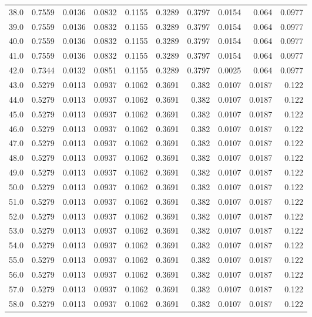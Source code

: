 \begin{longtable}{lrrrrrrrrr}
38.0 & 0.7559 & 0.0136 & 0.0832 & 0.1155 & 0.3289 & 0.3797 & 0.0154 & 0.064 & 0.0977 \\
39.0 & 0.7559 & 0.0136 & 0.0832 & 0.1155 & 0.3289 & 0.3797 & 0.0154 & 0.064 & 0.0977 \\
40.0 & 0.7559 & 0.0136 & 0.0832 & 0.1155 & 0.3289 & 0.3797 & 0.0154 & 0.064 & 0.0977 \\
41.0 & 0.7559 & 0.0136 & 0.0832 & 0.1155 & 0.3289 & 0.3797 & 0.0154 & 0.064 & 0.0977 \\
42.0 & 0.7344 & 0.0132 & 0.0851 & 0.1155 & 0.3289 & 0.3797 & 0.0025 & 0.064 & 0.0977 \\
43.0 & 0.5279 & 0.0113 & 0.0937 & 0.1062 & 0.3691 & 0.382 & 0.0107 & 0.0187 & 0.122 \\
44.0 & 0.5279 & 0.0113 & 0.0937 & 0.1062 & 0.3691 & 0.382 & 0.0107 & 0.0187 & 0.122 \\
45.0 & 0.5279 & 0.0113 & 0.0937 & 0.1062 & 0.3691 & 0.382 & 0.0107 & 0.0187 & 0.122 \\
46.0 & 0.5279 & 0.0113 & 0.0937 & 0.1062 & 0.3691 & 0.382 & 0.0107 & 0.0187 & 0.122 \\
47.0 & 0.5279 & 0.0113 & 0.0937 & 0.1062 & 0.3691 & 0.382 & 0.0107 & 0.0187 & 0.122 \\
48.0 & 0.5279 & 0.0113 & 0.0937 & 0.1062 & 0.3691 & 0.382 & 0.0107 & 0.0187 & 0.122 \\
49.0 & 0.5279 & 0.0113 & 0.0937 & 0.1062 & 0.3691 & 0.382 & 0.0107 & 0.0187 & 0.122 \\
50.0 & 0.5279 & 0.0113 & 0.0937 & 0.1062 & 0.3691 & 0.382 & 0.0107 & 0.0187 & 0.122 \\
51.0 & 0.5279 & 0.0113 & 0.0937 & 0.1062 & 0.3691 & 0.382 & 0.0107 & 0.0187 & 0.122 \\
52.0 & 0.5279 & 0.0113 & 0.0937 & 0.1062 & 0.3691 & 0.382 & 0.0107 & 0.0187 & 0.122 \\
53.0 & 0.5279 & 0.0113 & 0.0937 & 0.1062 & 0.3691 & 0.382 & 0.0107 & 0.0187 & 0.122 \\
54.0 & 0.5279 & 0.0113 & 0.0937 & 0.1062 & 0.3691 & 0.382 & 0.0107 & 0.0187 & 0.122 \\
55.0 & 0.5279 & 0.0113 & 0.0937 & 0.1062 & 0.3691 & 0.382 & 0.0107 & 0.0187 & 0.122 \\
56.0 & 0.5279 & 0.0113 & 0.0937 & 0.1062 & 0.3691 & 0.382 & 0.0107 & 0.0187 & 0.122 \\
57.0 & 0.5279 & 0.0113 & 0.0937 & 0.1062 & 0.3691 & 0.382 & 0.0107 & 0.0187 & 0.122 \\
58.0 & 0.5279 & 0.0113 & 0.0937 & 0.1062 & 0.3691 & 0.382 & 0.0107 & 0.0187 & 0.122 \\

\end{longtable}
